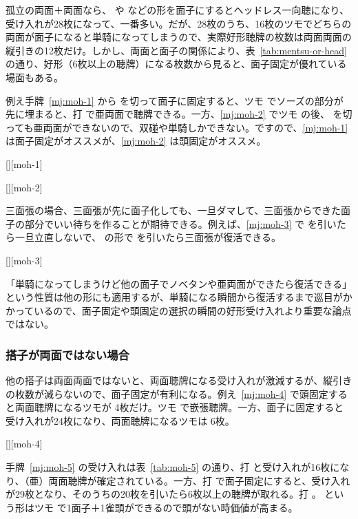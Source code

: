 \documentclass[../nankiru_main.tex]{subfiles}
\begin{document}
孤立の両面＋両面なら、 や  などの形を面子にするとヘッドレス一向聴になり、受け入れが28枚になって、一番多い。だが、28枚のうち、16枚のツモでどちらの両面が面子になると単騎になってしまうので、実際好形聴牌の枚数は両面両面の縦引きの12枚だけ。しかし、両面と面子の関係により、表~\ref{tab:mentsu-or-head} の通り、好形（6枚以上の聴牌）になる枚数から見ると、面子固定が優れている場面もある。

例え手牌~\ref{mj:moh-1} から  を切って面子に固定すると、ツモ  でソーズの部分が先に埋まると、打  で亜両面で聴牌できる。一方、\ref{mj:moh-2} でツモ  の後、 を切っても亜両面ができないので、双碰や単騎しかできない。ですので、\ref{mj:moh-1} は面子固定がオススメが、\ref{mj:moh-2} は頭固定がオススメ。

[][moh-1]

[][moh-2]

三面張の場合、三面張が先に面子化しても、一旦ダマして、三面張からできた面子の部分でいい待ちを作ることが期待できる。例えば、\ref{mj:moh-3} で  を引いたら一旦立直しないで、 の形で  を引いたら三面張が復活できる。

[][moh-3]

「単騎になってしまうけど他の面子でノベタンや亜両面ができたら復活できる」という性質は他の形にも適用するが、単騎になる瞬間から復活するまで巡目がかかっているので、面子固定や頭固定の選択の瞬間の好形受け入れより重要な論点ではない。


\subsubsection*{搭子が両面ではない場合}

他の搭子は両面両面ではないと、両面聴牌になる受け入れが激減するが、縦引きの枚数が減らないので、面子固定が有利になる。例え~\ref{mj:moh-4} で頭固定すると両面聴牌になるツモが  4枚だけ。ツモ  で嵌張聴牌。一方、面子に固定すると受け入れが24枚になり、両面聴牌になるツモは  6枚。

[][moh-4]

手牌~\ref{mj:moh-5} の受け入れは表~\ref{tab:moh-5} の通り、打  と受け入れが16枚になり、（亜）両面聴牌が確定されている。一方、打  で面子固定にすると、受け入れが29枚となり、そのうちの20枚を引いたら6枚以上の聴牌が取れる。打 。 という形はツモ  で1面子＋1雀頭ができるので頭がない時価値が高まる。
\end{document}
